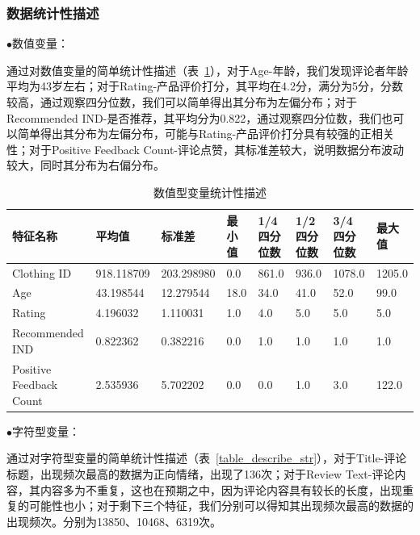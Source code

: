 \documentclass[
  journal=medium,
  manuscript=article-type,
  year=2023,
  volume=37,
]{cup-journal}
\begin{document}
    
\subsubsection{数据统计性描述}   

$\bullet$数值变量：

通过对数值变量的简单统计性描述（表~\ref{table_describe_number}），对于Age-年龄，我们发现评论者年龄平均为43岁左右；对于Rating-产品评价打分，其平均在4.2分，满分为5分，分数较高，通过观察四分位数，我们可以简单得出其分布为左偏分布；对于Recommended IND-是否推荐，其平均分为0.822，通过观察四分位数，我们也可以简单得出其分布为左偏分布，可能与Rating-产品评价打分具有较强的正相关性；对于Positive Feedback Count-评论点赞，其标准差较大，说明数据分布波动较大，同时其分布为右偏分布。

\begin{table}[hbt!]
    \begin{threeparttable}
    \caption{数值型变量统计性描述}
    \label{table_describe_number}
    \begin{tabular}{llllllll}
    \toprule
    \headrow 特征名称 & 平均值 & 标准差 & 最小值 & 1/4 四分位数 & 1/2 四分位数 & 3/4 四分位数 & 最大值\\
    \midrule
    Clothing ID & 918.118709 & 203.298980 & 0.0 & 861.0 & 936.0 & 1078.0 & 1205.0 \\ 
    \midrule
    Age & 43.198544 & 12.279544 & 18.0 & 34.0 & 41.0 & 52.0 & 99.0 \\
    \midrule
    Rating & 4.196032 & 1.110031 & 1.0 & 4.0 & 5.0 & 5.0 & 5.0 \\
    \midrule
    Recommended IND & 0.822362 & 0.382216 & 0.0 & 1.0 & 1.0 & 1.0 & 1.0 \\
    \midrule
    Positive Feedback Count & 2.535936 & 5.702202 & 0.0 & 0.0 & 1.0 & 3.0 & 122.0 \\
    \bottomrule 
    \end{tabular}
    \end{threeparttable}
\end{table}



$\bullet$字符型变量：

通过对字符型变量的简单统计性描述（表~\ref{table_describe_str}），对于Title-评论标题，出现频次最高的数据为正向情绪，出现了136次；对于Review Text-评论内容，其内容多为不重复，这也在预期之中，因为评论内容具有较长的长度，出现重复的可能性也小；对于剩下三个特征，我们分别可以得知其出现频次最高的数据的出现频次。分别为13850、10468、6319次。
\end{document}
